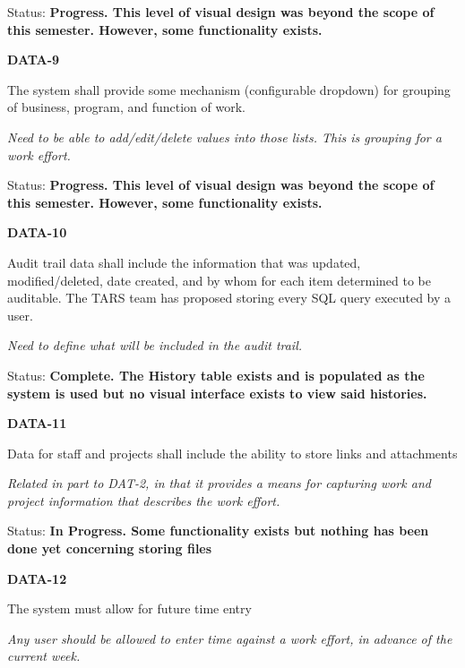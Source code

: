\noindent Status: \textbf{Progress.  This level of visual design was beyond the scope of this semester.  However, some functionality exists.}\\

\noindent 

\noindent \textbf{DATA-9}

\noindent The system shall provide some mechanism (configurable dropdown) for grouping of business, program, and function of work.

\textit{Need to be able to add/edit/delete values into those lists. This is grouping for a work effort.}

\noindent Status: \textbf{Progress.  This level of visual design was beyond the scope of this semester.  However, some functionality exists.}\\

\noindent 

\noindent \textbf{DATA-10}

\noindent Audit trail data shall include the information that was updated, modified/deleted, date created, and by whom for each item determined to be auditable. The TARS team has proposed storing every SQL query executed by a user.

 \textit{Need to define what will be included in the audit trail.}

\noindent Status: \textbf{Complete.  The History table exists and is populated as the system is used but no visual interface exists to view said histories.}\textit{}\\

\noindent 

\noindent \textbf{DATA-11}

\noindent Data for staff and projects shall include the ability to store links and attachments

\noindent \textit{Related in part to DAT-2, in that it provides a means for capturing work and project information that describes the work effort.}

\noindent Status: \textbf{In Progress.  Some functionality exists but nothing has been done yet concerning storing files} \\

\noindent 

\noindent \textbf{DATA-12}

\noindent The system must allow for future time entry

\noindent \textit{Any user should be allowed to enter time against a work effort, in advance of the current week.}

